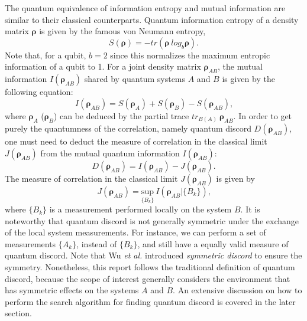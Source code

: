 \documentclass[%
 reprint,
 amsmath,amssymb,
 aps,
]{revtex4-1}
\begin{document}
The quantum equivalence of information entropy and mutual information are similar to their classical counterparts. Quantum information entropy of a density matrix $\boldsymbol{\rho}$ is given by the famous von Neumann entropy, 
\begin{equation}
S(\boldsymbol{\rho}) = -tr(\boldsymbol{\rho} \  log_b \boldsymbol{\rho}) \text{.}
\end{equation}
\noindent Note that, for a qubit, $b=2$ since this normalizes the maximum entropic information of a qubit to 1. For a joint density matrix $\boldsymbol{\rho}_{AB}$, the mutual information $\textit{I}(\boldsymbol{\rho}_{AB})$ shared by quantum systems $A$ and $B$ is given by the following equation:
\begin{equation}
\textit{I}(\boldsymbol{\rho}_{AB}) = S(\boldsymbol{\rho}_A) + S(\boldsymbol{\rho}_B) - S(\boldsymbol{\rho}_{AB}) \label{quan.cor.} \text{,}
\end{equation}
\noindent where $\boldsymbol{\rho}_A$ ($\boldsymbol{\rho}_B$) can be deduced by the partial trace $tr_{B(A)} \  \boldsymbol{\rho}_{AB}$. In order to get purely the quantumness of the correlation, namely quantum discord $\textit{D}(\boldsymbol{\rho}_{AB})$, one must need to deduct the measure of correlation in the classical limit $\textit{J}(\boldsymbol{\rho}_{AB})$ from the mutual quantum information $\textit{I}(\boldsymbol{\rho}_{AB})$:
\begin{equation}
\textit{D}(\boldsymbol{\rho}_{AB}) = \textit{I}(\boldsymbol{\rho}_{AB}) - \textit{J}(\boldsymbol{\rho}_{AB}) \text{.}
\end{equation}
\noindent The measure of correlation in the classical limit $\textit{J}(\boldsymbol{\rho}_{AB})$ is given by
\begin{equation}
\textit{J}(\boldsymbol{\rho}_{AB}) = \underset{\{B_k\}}{\text{sup}}\ \textit{I}(\boldsymbol{\rho}_{AB}|\{B_k\}) \label{clas.cor.} \text{,}
\end{equation}
\noindent where $\{B_k\}$ is a measurement performed locally on the system $B$. It is noteworthy that quantum discord is not generally symmetric under the exchange of the local system measurements. For instance, we can perform a set of measurements $\{A_k\}$, instead of $\{B_k\}$, and still have a equally valid measure of quantum discord. Note that Wu \textit{et al.} introduced \textit{symmetric discord} to ensure the symmetry. Nonetheless, this report follows the traditional definition of quantum discord, because the scope of interest generally considers the environment that has symmetric effects on the systems $A$ and $B$. An extensive discussion on how to perform the search algorithm for finding quantum discord is covered in the later section.
\end{document}
